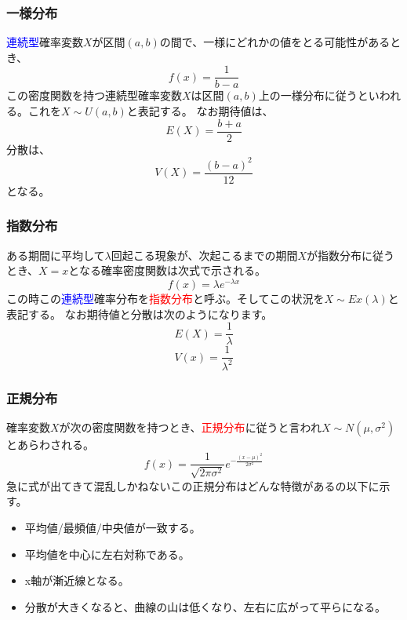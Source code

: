\documentclass[a4paper,10pt]{jarticle}
\begin{document}
\subsubsection{一様分布}
\textcolor{blue}{連続型}確率変数$X$が区間$(a,b)$の間で、一様にどれかの値をとる可能性があるとき、
\begin{equation}
    f(x)=\frac{1}{b-a}\tag{3,7}
\end{equation}
この密度関数を持つ連続型確率変数$X$は区間$(a,b)$上の一様分布に従うといわれる。これを$X\sim U(a,b)$と表記する。
なお期待値は、
\begin{equation}
    E(X)=\frac{b+a}{2}\tag{3,8}
\end{equation}
分散は、
\begin{equation}
    V(X)=\frac{(b-a)^2}{12}\tag{3,9}
\end{equation}
となる。
\subsubsection{指数分布}
ある期間に平均して$\lambda$回起こる現象が、次起こるまでの期間$X$が指数分布に従うとき、$X=x$となる確率密度関数は次式で示される。
\begin{equation}
    f(x) = \lambda e^{-\lambda x}\tag{3,10}
\end{equation}
この時この\textcolor{blue}{連続型}確率分布を\textcolor{red}{指数分布}と呼ぶ。そしてこの状況を$X\sim Ex(\lambda)$と表記する。
なお期待値と分散は次のようになります。
\begin{equation}
    E(X)=\frac{1}{\lambda}\tag{3,11}
\end{equation}
\begin{equation}
    V(x)=\frac{1}{\lambda^2}\tag{3,12}
\end{equation}
\subsubsection{正規分布}
確率変数$X$が次の密度関数を持つとき、\textcolor{red}{正規分布}に従うと言われ$X\sim N(\mu,\sigma^2)$とあらわされる。
\begin{equation}
    f(x) = \frac{1}{\sqrt{2\pi\sigma^2}}e^{-\frac{(x-\mu)^2}{2\sigma^2}}\tag{3,13}
\end{equation}
急に式が出てきて混乱しかねないこの正規分布はどんな特徴があるの以下に示す。
\begin{itemize}
    \item 平均値/最頻値/中央値が一致する。
    \item 平均値を中心に左右対称である。
    \item x軸が漸近線となる。
    \item 分散が大きくなると、曲線の山は低くなり、左右に広がって平らになる。
\end{itemize}
\end{document}
